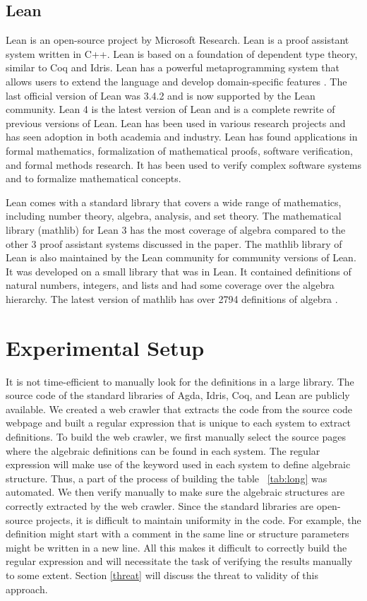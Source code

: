 \subsection{Lean}

Lean \cite{de2015lean} is an open-source project by Microsoft Research. Lean is
a proof assistant system written in C++. Lean is based on a foundation of
dependent type theory, similar to Coq and Idris. Lean has a powerful
metaprogramming system that allows users to extend the language and develop
domain-specific features \cite{ebner2017metaprogramming}. The last official
version of Lean was 3.4.2 and is now supported by the Lean community. Lean 4 is
the latest version of Lean and is a complete rewrite of previous versions of
Lean. Lean has been used in various research projects and has seen adoption in
both academia and industry. Lean has found applications in formal mathematics,
formalization of mathematical proofs, software verification, and formal methods
research. It has been used to verify complex software systems and to formalize
mathematical concepts.

Lean comes with a standard library that covers a wide range of mathematics,
including number theory, algebra, analysis, and set theory. The mathematical
library (mathlib) \cite{10.1145/3372885.3373824} for Lean 3 has the most
coverage of algebra compared to the other 3 proof assistant systems discussed in
the paper. The mathlib library of Lean is also maintained by the Lean community
for community versions of Lean. It was developed on a small library that was in
Lean. It contained definitions of natural numbers, integers, and lists and had
some coverage over the algebra hierarchy. The latest version of mathlib has over
2794 definitions of algebra \cite{2019arXiv191203028S}. 

\section{Experimental Setup}
\label{experiment}
It is not time-efficient to manually look for the definitions in a large
library. The source code of the standard libraries of Agda, Idris, Coq, and Lean
are publicly available. We created a web crawler that extracts the code from the
source code webpage and built a regular expression that is unique to each system
to extract definitions. To build the web crawler, we first manually select the
source pages where the algebraic definitions can be found in each system. The
regular expression will make use of the keyword used in each system to
define algebraic structure. Thus, a part of the process of building the table
~\ref{tab:long} was automated. We then verify manually to make sure the
algebraic structures are correctly extracted by the web crawler. Since the
standard libraries are open-source projects, it is difficult to maintain
uniformity in the code. For example, the definition might start with a comment
in the same line or structure parameters might be written in a new line. All
this makes it difficult to correctly build the regular expression and will
necessitate the task of verifying the results manually to some extent. Section
\ref{threat} will discuss the threat to validity of this approach.

